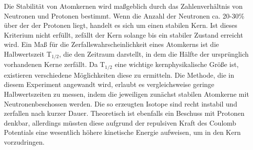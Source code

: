 Die Stabilität von Atomkernen wird maßgeblich durch das Zahlenverhältnis von Neutronen und Protonen bestimmt. Wenn die 
Anzahl der Neutronen ca. 20-30\% über der der Protonen liegt, handelt es sich um einen stabilen Kern. Ist dieses 
Kriterium nicht erfüllt, zefällt der Kern solange bis ein stabiler Zustand erreicht wird. 
\newline
\newline
Ein Maß für die Zerfallswahrscheinlichkeit eines Atomkerns ist die Halbwertszeit T$_{1/2}$, die den Zeitraum darstellt,
in dem die Hälfte der ursprünglich vorhandenen Kerne zerfällt. Da T$_{1/2}$ eine wichtige kernphysikalische Größe ist,
existieren verschiedene Möglichkeiten diese zu ermitteln. Die Methode, die in diesem Experiment angewandt wird, erlaubt
es  vergleichsweise geringe Halbwertszeiten zu messen, indem die jeweiligen zunächst stabilen Atomkerne mit
Neutronenbeschossen werden. Die so erzeugten Isotope sind recht instabil und zerfallen nach kurzer Dauer. Theoretisch
ist ebenfalls ein Beschuss mit Protonen denkbar, allerdings müssten diese aufgrund der repulsiven Kraft des Coulomb 
Potentials eine wesentlich höhere kinetische Energie aufweisen, um in den Kern vorzudringen.